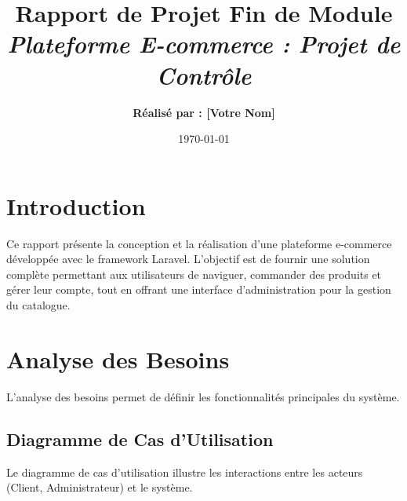 \documentclass[12pt,a4paper]{report}
\title{
    \vspace{2cm}
    \textbf{\Huge Rapport de Projet Fin de Module} \\
    \vspace{1cm}
    \textit{\Large Plateforme E-commerce : Projet de Contrôle}
}
\author{\textbf{Réalisé par : [Votre Nom]}}
\date{\today}
\begin{document}
\maketitle

\tableofcontents
\newpage

\chapter{Introduction}
Ce rapport présente la conception et la réalisation d'une plateforme e-commerce développée avec le framework Laravel. L'objectif est de fournir une solution complète permettant aux utilisateurs de naviguer, commander des produits et gérer leur compte, tout en offrant une interface d'administration pour la gestion du catalogue.

\chapter{Analyse des Besoins}
L'analyse des besoins permet de définir les fonctionnalités principales du système.

\section{Diagramme de Cas d'Utilisation}
Le diagramme de cas d'utilisation illustre les interactions entre les acteurs (Client, Administrateur) et le système.

\begin{center}
\end{center}
\end{document}
